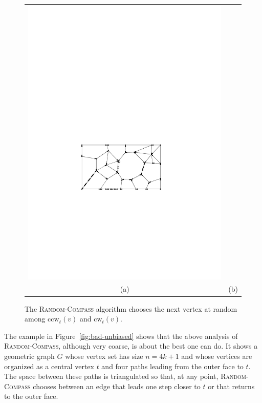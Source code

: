 \documentclass [letterpaper] {patmorin}
\newcommand{\ccw}{\mathrm{ccw}}
\newcommand{\cw}{\mathrm{cw}}
\begin{document}
\begin{figure}
\begin{center}
\begin{tabular}{cc}
    \includegraphics{pics/aux-graph} \\
    (a) & (b)
    \end{tabular}
  \end{center}
  \caption{The \textsc{Random-Compass} algorithm chooses the next vertex at random among $\ccw_t(v)$ and $\cw_t(v)$.}
  \label{fig:random-compass}
\end{figure}

The example in Figure~\ref{fig:bad-unbiased} shows that the above analysis of \textsc{Random-Compass}, although very coarse, is about the best one can do. It shows a geometric graph $G$ whose vertex set has size $n=4k+1$ and whose vertices are organized as a central vertex $t$ and four paths leading from the outer face to $t$.  The space between these paths is triangulated so that, at any point, \textsc{Random-Compass} chooses between an edge that leads one step closer to $t$ or that returns to the outer face.
\end{document}
